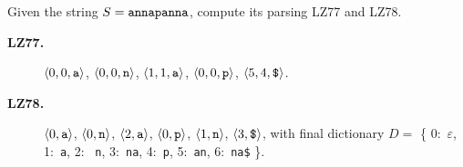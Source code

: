 \exercise

Given the string $S = \text{\tt annapanna}$, compute its parsing LZ77 and LZ78.

\solution

\begin{description}

  \item[\small \bf LZ77.]  $\langle 0, 0, \text{\tt a}\rangle$, $\langle 0, 0,
  \text{\tt n}\rangle$, $\langle 1, 1, \text{\tt a}\rangle$, $\langle 0, 0,
  \text{\tt p}\rangle$, $\langle 5, 4, \text{\tt \$}\rangle$.

  \item[\small \bf LZ78.] $\langle 0, \text{\tt a}\rangle$, $\langle 0, \text{\tt
  n}\rangle$, $\langle 2, \text{\tt a}\rangle$, $\langle 0, \text{\tt
  p}\rangle$, $\langle 1, \text{\tt n}\rangle$, $\langle 3, \text{\tt
  \$}\rangle$, with final dictionary $D = $ \{ 0:~$\varepsilon$, 1:~{\tt a}, 2: {\tt
  n}, 3:~{\tt na}, 4:~{\tt p}, 5:~{\tt an}, 6:~{\tt na\$} \}.

\end{description}
